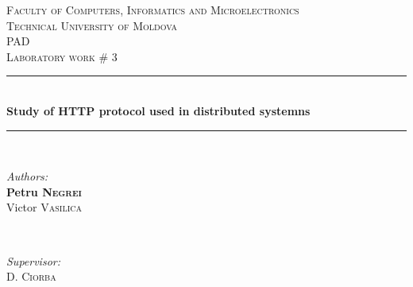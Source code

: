 \documentclass[12pt]{article}
\begin{document}
  \begin{titlepage}

 \newcommand{\HRule}{\rule{\linewidth}{0.5mm}} %
  \begin{center} %

  \textsc{\large Faculty of Computers, Informatics and Microelectronics}\\[0.5cm]
  \textsc{\large Technical University of Moldova}\\[1.2cm] %
  \vspace{35 mm}
  \textsc{\Large PAD}\\[0.5cm] %
  \textsc{\large Laboratory work \# 3}\\[0.5cm] %

  \vspace{10 mm}
  \HRule \\[0.4cm]
  { \large \bfseries   Study of HTTP protocol used in distributed systemns  }\\[0.4cm] %
  \HRule \\[1.5cm]

      \vspace{30mm}

      \begin{minipage}{0.4\textwidth}
      \begin{flushleft} \large
      \emph{Authors:}\\
      \textbf{Petru \textsc{Negrei}} \\
      Victor \textsc{Vasilica}
      \end{flushleft}
      \end{minipage}
      ~
      \begin{minipage}{0.4\textwidth}
      \begin{flushright} \large
      \emph{Supervisor:} \\
      D. \textsc{Ciorba} %
      \end{flushright}
      \end{minipage}\\[4cm]


\end{center}
\end{titlepage}
\end{document}
